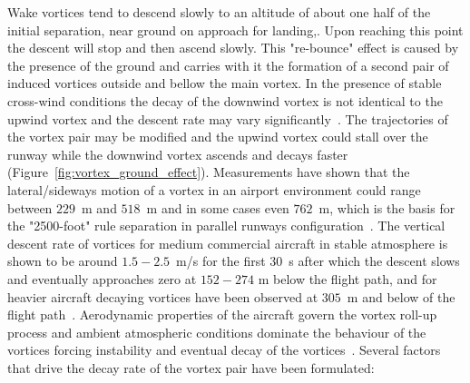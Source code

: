 Wake vortices tend to descend slowly to an altitude of about one half of the initial separation, near ground on approach for landing,.
Upon reaching this point the descent will stop and then ascend slowly. This "re-bounce" effect is caused by the presence of the ground and carries with it the formation of a second pair of induced vortices outside and bellow the main vortex. 
In the presence of stable cross-wind conditions the decay of the downwind vortex is not identical to the upwind vortex and the descent rate may vary significantly~\cite{Hallock2018Apr}. 
The trajectories of the vortex pair may be modified and the upwind vortex could stall over the runway while the downwind vortex ascends and decays faster (Figure~\ref{fig:vortex_ground_effect}).
Measurements have shown that the lateral/sideways motion of a vortex in an airport environment could range between $229$~m and $518$~m and in some cases even $762$~m, which is the basis for the "2500-foot"  rule separation in parallel runways configuration~\cite{Hallock2018Apr, hallock2004summary, hallock2003wake}. The vertical descent rate of vortices for medium commercial aircraft in stable atmosphere  is shown to be around $1.5-2.5$~m/s for the first $30$~s after which the descent slows and eventually approaches zero at $152-274$ m below the flight path, and for heavier aircraft decaying vortices have been observed at $305$~m and below of the flight path~\cite{lissaman1973aircraft, Hallock2018Apr}. 
Aerodynamic properties of the aircraft govern the vortex roll-up process and ambient atmospheric conditions dominate the behaviour of the vortices forcing instability and eventual decay of the vortices~\cite{Hallock2018Apr}.
Several factors that drive the decay rate of the vortex pair have been formulated:
